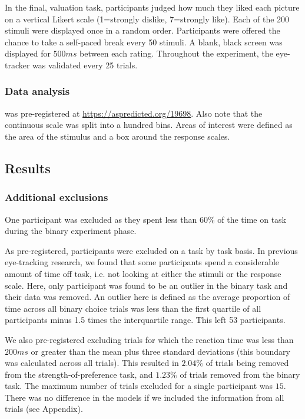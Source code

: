 \documentclass[doc, a4paper, apacite]{apa6}
\begin{document}
In the final, valuation task, participants judged how much they liked each picture on a vertical Likert scale (1=strongly dislike, 7=strongly like). Each of the 200 stimuli were displayed once in a random order. Participants were offered the chance to take a self-paced break every 50 stimuli. A blank, black screen was displayed for $500ms$ between each rating. Throughout the experiment, the eye-tracker was validated every 25 trials.

\subsubsection{Data analysis}
 was pre-registered at \url{https://aspredicted.org/19698}.
Also note that the continuous scale was split into a hundred bins. Areas of interest were defined as the area of the stimulus and a box around the response scales.

\subsection{Results}

\subsubsection{Additional exclusions}
One participant was excluded as they spent less than 60\% of the time on task during the binary experiment phase. 

As pre-registered, participants were excluded on a task by task basis. In previous eye-tracking research, we found that some participants spend a considerable amount of time off task, i.e. not looking at either the stimuli or the response scale. Here, only participant was found to be an outlier in the binary task and their data was removed. An outlier here is defined as the average proportion of time across all binary choice trials was less than the first quartile of all participants minus 1.5 times the interquartile range. This left 53 participants. 

We also pre-registered excluding trials for which the reaction time was less than $200ms$ or greater than the mean plus three standard deviations (this boundary was calculated across all trials). This resulted in $2.04\%$ of trials being removed from the strength-of-preference task, and $1.23\%$ of trials removed from the binary task. The maximum number of trials excluded for a single participant was $15$. There was no difference in the models if we included the information from all trials (see Appendix). 
\end{document}
